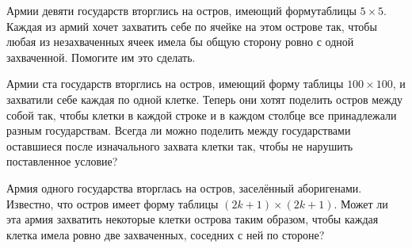 ﻿
\begin{itemize}

\itA Армии девяти государств вторглись на остров, имеющий форму\linebreak таблицы $5 \times 5$. Каждая из армий хочет захватить себе по ячейке на этом острове так, чтобы любая из незахваченных ячеек имела бы общую сторону ровно с одной захваченной. Помогите им это сделать.

\itB Армии ста государств вторглись на остров, имеющий форму таблицы $100 \times 100$, и захватили себе каждая по одной клетке. Теперь они хотят поделить остров между собой так, чтобы клетки в каждой строке и в каждом столбце все принадлежали разным государствам. Всегда ли можно поделить между государствами оставшиеся после изначального захвата клетки так, чтобы не нарушить поставленное условие?

\itC Армия одного государства вторглась на остров, заселённый аборигенами. Известно, что остров имеет форму таблицы $(2k+1) \times (2k+1)$. Может ли эта армия захватить некоторые клетки острова таким образом, чтобы каждая клетка имела ровно две захваченных, соседних с ней по стороне?
\end{itemize}